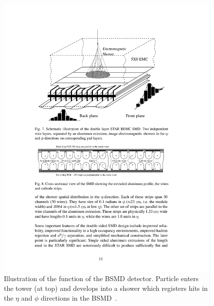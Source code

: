 \begin{figure}[htbp]
\begin{center}
\includegraphics[scale=1.0]{Plots/Detector/SMD.pdf}
\end{center}
\caption[BSMD Diagram]{Illustration of the function of the BSMD detector. Particle enters the tower (at top) and develops into a shower which registers hits in the $\eta$ and $\phi$ directions in the BSMD~\cite{emcNIM}.}
\label{fig:SMD}
\end{figure}
